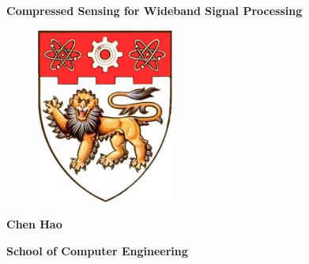 \documentclass[12pt,a4paper]{report}
\begin{document}
\pagestyle{empty}
\begin{center}
\LARGE \textbf{Compressed Sensing for Wideband Signal Processing}
\end{center}
\vspace{1cm}

\begin{figure}[!h]
  \begin{center}
    \includegraphics[width=4.5cm]{ntu_logo.eps}
  \end{center}
\end{figure}

\vspace{0.5cm} \large
\begin{center}
\textbf{Chen Hao}
\end{center}
\vspace{0.3cm}

\begin{center}
\textbf{School of Computer Engineering}
\end{center}
\vspace{0.5cm} \normalsize
\end{document}
